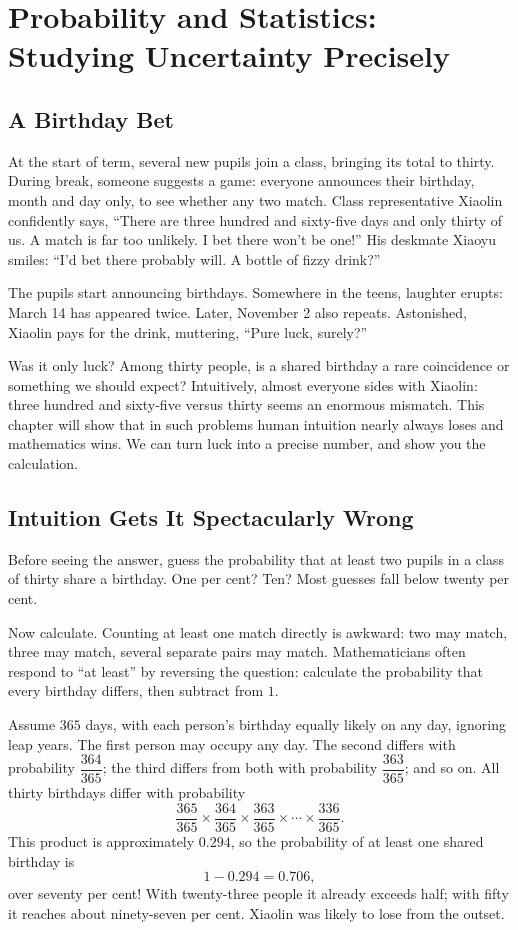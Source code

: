 \chapter{Probability and Statistics: Studying Uncertainty Precisely}

\section{A Birthday Bet}

At the start of term, several new pupils join a class, bringing its total to thirty. During break, someone suggests a game: everyone announces their birthday, month and day only, to see whether any two match. Class representative Xiaolin confidently says, ``There are three hundred and sixty-five days and only thirty of us. A match is far too unlikely. I bet there won't be one!'' His deskmate Xiaoyu smiles: ``I'd bet there probably will. A bottle of fizzy drink?''

The pupils start announcing birthdays. Somewhere in the teens, laughter erupts: March 14 has appeared twice. Later, November 2 also repeats. Astonished, Xiaolin pays for the drink, muttering, ``Pure luck, surely?''

Was it only luck? Among thirty people, is a shared birthday a rare coincidence or something we should expect? Intuitively, almost everyone sides with Xiaolin: three hundred and sixty-five versus thirty seems an enormous mismatch. This chapter will show that in such problems human intuition nearly always loses and mathematics wins. We can turn luck into a precise number, and show you the calculation.

\section{Intuition Gets It Spectacularly Wrong}

Before seeing the answer, guess the probability that at least two pupils in a class of thirty share a birthday. One per cent? Ten? Most guesses fall below twenty per cent.

Now calculate. Counting at least one match directly is awkward: two may match, three may match, several separate pairs may match. Mathematicians often respond to ``at least'' by reversing the question: calculate the probability that every birthday differs, then subtract from $1$.

Assume $365$ days, with each person's birthday equally likely on any day, ignoring leap years. The first person may occupy any day. The second differs with probability $\dfrac{364}{365}$; the third differs from both with probability $\dfrac{363}{365}$; and so on. All thirty birthdays differ with probability
\[
\frac{365}{365}\times\frac{364}{365}\times\frac{363}{365}\times\cdots\times\frac{336}{365}.
\]
This product is approximately $0.294$, so the probability of at least one shared birthday is
\[
1-0.294=0.706,
\]
over seventy per cent! With twenty-three people it already exceeds half; with fifty it reaches about ninety-seven per cent. Xiaolin was likely to lose from the outset.


